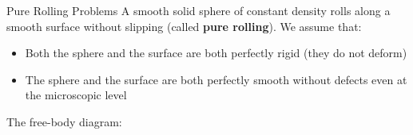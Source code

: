 \documentclass[12pt,compress,aspectratio=169]{beamer}
\begin{document}
\begin{frame}{Pure Rolling Problems}
  A smooth solid sphere of constant density rolls along a smooth surface
  without slipping (called \textbf{pure rolling}). We assume that:
  \begin{itemize}
    \item Both the sphere and the surface are both perfectly rigid (they
      do not deform)
    \item The sphere and the surface are both perfectly smooth without defects
      even at the microscopic level
  \end{itemize}
  The free-body diagram: %
  \begin{center}
  \end{center}
\end{frame}
\end{document}
